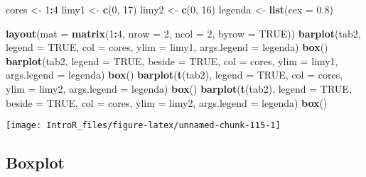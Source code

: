 \documentclass[
]{book}
\newenvironment{Shaded}{\begin{snugshade}}{\end{snugshade}}
\newcommand{\DataTypeTok}[1]{\textcolor[rgb]{0.13,0.29,0.53}{#1}}
\newcommand{\DecValTok}[1]{\textcolor[rgb]{0.00,0.00,0.81}{#1}}
\newcommand{\FloatTok}[1]{\textcolor[rgb]{0.00,0.00,0.81}{#1}}
\newcommand{\KeywordTok}[1]{\textcolor[rgb]{0.13,0.29,0.53}{\textbf{#1}}}
\newcommand{\NormalTok}[1]{#1}
\newcommand{\OperatorTok}[1]{\textcolor[rgb]{0.81,0.36,0.00}{\textbf{#1}}}
\newcommand{\OtherTok}[1]{\textcolor[rgb]{0.56,0.35,0.01}{#1}}
\newcommand{\StringTok}[1]{\textcolor[rgb]{0.31,0.60,0.02}{#1}}
\begin{document}
\begin{Shaded}
\begin{Highlighting}[]
\NormalTok{cores <-}\StringTok{ }\DecValTok{1}\OperatorTok{:}\DecValTok{4}
\NormalTok{limy1 <-}\StringTok{ }\KeywordTok{c}\NormalTok{(}\DecValTok{0}\NormalTok{, }\DecValTok{17}\NormalTok{)}
\NormalTok{limy2 <-}\StringTok{ }\KeywordTok{c}\NormalTok{(}\DecValTok{0}\NormalTok{, }\DecValTok{16}\NormalTok{)}
\NormalTok{legenda <-}\StringTok{ }\KeywordTok{list}\NormalTok{(}\DataTypeTok{cex =} \FloatTok{0.8}\NormalTok{)}

\KeywordTok{layout}\NormalTok{(}\DataTypeTok{mat =} \KeywordTok{matrix}\NormalTok{(}\DecValTok{1}\OperatorTok{:}\DecValTok{4}\NormalTok{, }\DataTypeTok{nrow =} \DecValTok{2}\NormalTok{, }\DataTypeTok{ncol =} \DecValTok{2}\NormalTok{, }\DataTypeTok{byrow =} \OtherTok{TRUE}\NormalTok{))}
\KeywordTok{barplot}\NormalTok{(tab2, }\DataTypeTok{legend =} \OtherTok{TRUE}\NormalTok{, }\DataTypeTok{col =}\NormalTok{ cores, }\DataTypeTok{ylim =}\NormalTok{ limy1, }
        \DataTypeTok{args.legend =}\NormalTok{ legenda)}
\KeywordTok{box}\NormalTok{()}
\KeywordTok{barplot}\NormalTok{(tab2, }\DataTypeTok{legend =} \OtherTok{TRUE}\NormalTok{, }\DataTypeTok{beside =} \OtherTok{TRUE}\NormalTok{, }\DataTypeTok{col =}\NormalTok{ cores, }
        \DataTypeTok{ylim =}\NormalTok{ limy1, }\DataTypeTok{args.legend =}\NormalTok{ legenda)}
\KeywordTok{box}\NormalTok{()}
\KeywordTok{barplot}\NormalTok{(}\KeywordTok{t}\NormalTok{(tab2), }\DataTypeTok{legend =} \OtherTok{TRUE}\NormalTok{, }\DataTypeTok{col =}\NormalTok{ cores, }\DataTypeTok{ylim =}\NormalTok{ limy2, }
        \DataTypeTok{args.legend =}\NormalTok{ legenda)}
\KeywordTok{box}\NormalTok{()}
\KeywordTok{barplot}\NormalTok{(}\KeywordTok{t}\NormalTok{(tab2), }\DataTypeTok{legend =} \OtherTok{TRUE}\NormalTok{, }\DataTypeTok{beside =} \OtherTok{TRUE}\NormalTok{, }\DataTypeTok{col =}\NormalTok{ cores, }
        \DataTypeTok{ylim =}\NormalTok{ limy2, }\DataTypeTok{args.legend =}\NormalTok{ legenda)}
\KeywordTok{box}\NormalTok{()}
\end{Highlighting}
\end{Shaded}

\begin{center}\texttt{[image: IntroR\_files/figure-latex/unnamed-chunk-115-1]} \end{center}

\hypertarget{boxplot-1}{%
\subsection{Boxplot}\label{boxplot-1}}
\end{document}
